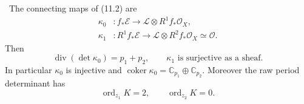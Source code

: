 \begin{proposition}
\label{prop:log-ks-divisor}
\Verified\ The connecting maps of (11.2) are
\begin{align*}
 \kappa_0&:f_*\mathcal E\longrightarrow
  \mathcal L\otimes R^1f_*\mathcal O_X,\\
 \kappa_1&:R^1f_*\mathcal E\longrightarrow
  \mathcal L\otimes R^2f_*\mathcal O_X\simeq\mathcal O.
\end{align*}
Then
\[
 \operatorname{div}(\det\kappa_0)=p_1+p_2,
 \qquad \kappa_1\text{ is surjective as a sheaf}.
\tag{11.6}
\]
In particular $\kappa_0$ is injective and
$\operatorname{coker}\kappa_0=\mathbb C_{p_1}\oplus\mathbb C_{p_2}$.
Moreover the raw period determinant has
\[
 \operatorname{ord}_{z_1}K=2,\qquad
 \operatorname{ord}_{z_2}K=0.
\tag{11.7}
\]
\end{proposition}

